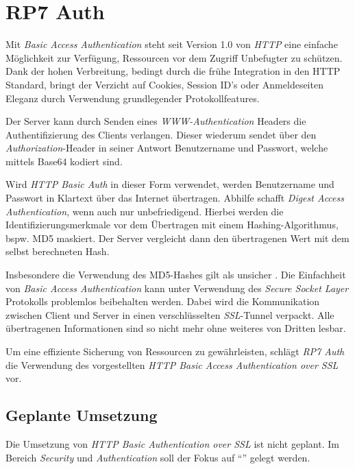 \section{RP7 Auth}
\label{sec:principle-rp7-auth}


Mit \emph{Basic Access Authentication} \cite{HTTPBasicAuth} steht seit Version 1.0 von \emph{HTTP} eine einfache Möglichkeit zur Verfügung, Ressourcen vor dem Zugriff Unbefugter zu schützen. Dank der hohen Verbreitung, bedingt durch die frühe Integration in den HTTP Standard, bringt der Verzicht auf Cookies, Session ID's oder Anmeldeseiten Eleganz durch Verwendung grundlegender Protokollfeatures.

Der Server kann durch Senden eines \emph{WWW-Authentication} Headers die Authentifizierung des Clients verlangen. Dieser wiederum sendet über den \emph{Authorization}-Header in seiner Antwort Benutzername und Passwort, welche mittels Base64 \cite{Base64} kodiert sind.

Wird \emph{HTTP Basic Auth} in dieser Form verwendet, werden Benutzername und Passwort in Klartext über das Internet übertragen. Abhilfe schafft \emph{Digest Access Authentication}, wenn auch nur unbefriedigend. Hierbei werden die Identifizierungsmerkmale vor dem Übertragen mit einem Hashing-Algorithmus, bspw. MD5 maskiert. Der Server vergleicht dann den übertragenen Wert mit dem selbst berechneten Hash.

Insbesondere die Verwendung des MD5-Hashes gilt als unsicher \cite{MD5Broken}. Die Einfachheit von \emph{Basic Access Authentication} kann unter Verwendung des \emph{Secure Socket Layer} Protokolls \cite{SSL} problemlos beibehalten werden. Dabei wird die Kommunikation zwischen Client und Server in einen verschlüsselten \emph{\gls{SSL}}-Tunnel verpackt. Alle übertragenen Informationen sind so nicht mehr ohne weiteres von Dritten lesbar.

Um eine effiziente Sicherung von Ressourcen zu gewährleisten, schlägt \emph{RP7 Auth} die Verwendung des vorgestellten \emph{HTTP Basic Access Authentication over SSL} vor.


\subsection*{Geplante Umsetzung}

Die Umsetzung von \emph{HTTP Basic Authentication over SSL} ist nicht geplant. Im Bereich \emph{Security} und \emph{Authentication} soll der Fokus auf ``'' gelegt werden.

